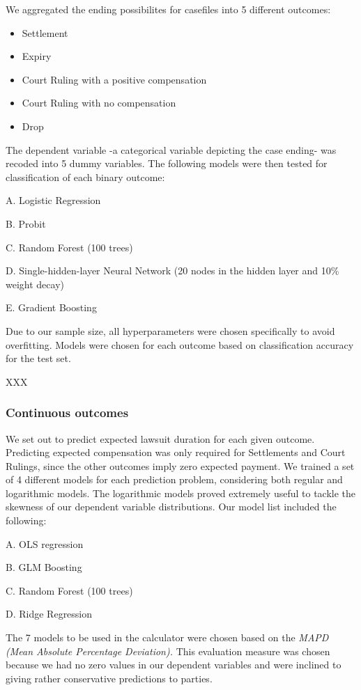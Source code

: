 \documentclass[]{article}
\begin{document}
We aggregated the ending possibilites for casefiles into 5 different
outcomes:

\begin{itemize}
\item
  Settlement
\item
  Expiry
\item
  Court Ruling with a positive compensation
\item
  Court Ruling with no compensation
\item
  Drop
\end{itemize}

The dependent variable -a categorical variable depicting the case
ending- was recoded into 5 dummy variables. The following models were
then tested for classification of each binary outcome:

A. Logistic Regression

B. Probit

C. Random Forest (100 trees)

D. Single-hidden-layer Neural Network (20 nodes in the hidden layer and
10\% weight decay)

E. Gradient Boosting

Due to our sample size, all hyperparameters were chosen specifically to
avoid overfitting. Models were chosen for each outcome based on
classification accuracy for the test set.

XXX

\subsubsection{Continuous outcomes}\label{continuous-outcomes}

We set out to predict expected lawsuit duration for each given outcome.
Predicting expected compensation was only required for Settlements and
Court Rulings, since the other outcomes imply zero expected payment. We
trained a set of 4 different models for each prediction problem,
considering both regular and logarithmic models. The logarithmic models
proved extremely useful to tackle the skewness of our dependent variable
distributions. Our model list included the following:

A. OLS regression

B. GLM Boosting

C. Random Forest (100 trees)

D. Ridge Regression

The 7 models to be used in the calculator were chosen based on the
\emph{MAPD (Mean Absolute Percentage Deviation).} This evaluation
measure was chosen because we had no zero values in our dependent
variables and were inclined to giving rather conservative predictions to
parties.
\end{document}
